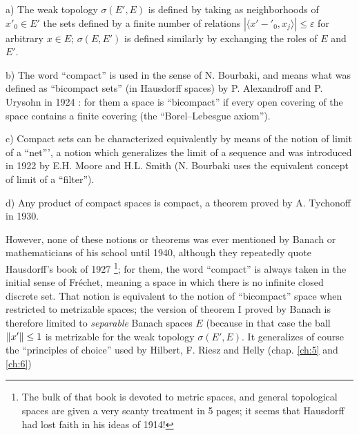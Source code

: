\documentclass[12pt,a4paper,leqno,twoside]{extbook}
\DeclarePairedDelimiter{\norm}{\lVert}{\rVert}
\begin{document}
a) The weak topology \(\sigma(E',E)\) is defined by taking as neighborhoods of \(x'_0 \in E'\) the sets defined by a finite number of relations \(|\langle x'-'_0, x_j\rangle| \leq \varepsilon\) for arbitrary \(x \in E\); \(\sigma(E,E')\) is defined similarly by exchanging the roles of \(E\) and \(E'\).

b) The word ``compact'' is used in the sense of N. Bourbaki, and means what was defined as ``bicompact sets'' (in Hausdorff spaces) by P. Alexandroff and P. Urysohn in 1924 \cite{006}: for them a space is ``bicompact'' if every open covering of the space contains a finite covering (the ``Borel--Lebesgue axiom'').

c) Compact sets can be characterized equivalently by means of the notion of limit of a ``net''', a notion which generalizes the limit of a sequence and was introduced in 1922 by E.H. Moore and H.L. Smith \cite{164} (N. Bourbaki uses the equivalent concept of limit of a ``filter'').

d) Any product of compact spaces is compact, a theorem proved by A. Tychonoff in 1930.

However, none of these notions or theorems was ever mentioned by Banach or mathematicians of his school until 1940, although they repeatedly quote Hausdorff's book of 1927 \footnote{The bulk of that book \cite{101} is devoted to metric spaces, and general topological spaces are given a very scanty treatment in 5 pages; it seems that Hausdorff had lost faith in his ideas of 1914!}; for them, the word ``compact'' is always taken in the initial sense of Fréchet, meaning a space in which there is no infinite closed discrete set. That notion is equivalent to the notion of ``bicompact'' space when restricted to metrizable spaces; the version of theorem I proved by Banach \cite[p.~123]{015} is therefore limited to \emph{separable} Banach spaces \(E\) (because in that case the ball \(\norm{x'} \leq 1\) is metrizable for the weak topology \(\sigma(E',E)\). It generalizes of course the ``principles of choice'' used by Hilbert, F. Riesz and Helly (chap. \ref{ch:5} and \ref{ch:6})
\end{document}
